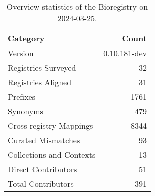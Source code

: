 \begin{table}
\caption{Overview statistics of the Bioregistry on 2024-03-25.}
\label{tab:bioregistry-summary}
\begin{tabular}{lr}
\toprule
Category & Count \\
\midrule
Version & 0.10.181-dev \\
Registries Surveyed & 32 \\
Registries Aligned & 31 \\
Prefixes & 1761 \\
Synonyms & 479 \\
Cross-registry Mappings & 8344 \\
Curated Mismatches & 93 \\
Collections and Contexts & 13 \\
Direct Contributors & 51 \\
Total Contributors & 391 \\
\bottomrule
\end{tabular}
\end{table}
